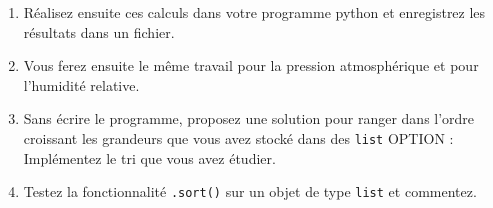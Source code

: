 \begin{enumerate}
\item Réalisez ensuite ces calculs dans votre programme python et enregistrez les résultats dans un fichier.

\item Vous ferez ensuite le même travail pour la pression atmosphérique et pour l'humidité relative.

\item Sans écrire le programme, proposez une solution pour ranger dans l'ordre croissant les grandeurs que vous avez stocké dans des \texttt{list}
  OPTION : Implémentez le tri que vous avez étudier.

\item Testez la fonctionnalité \texttt{.sort()} sur un objet de type \texttt{list} et commentez.

\end{enumerate}

